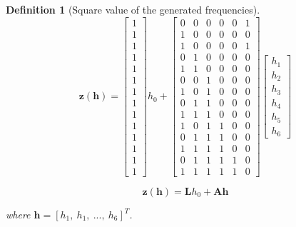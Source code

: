 \documentclass{article}
\newtheorem{mydef}{Definition}[section]
\begin{document}
\begin{mydef}[Square value of the generated frequencies]
\begin{equation}
\mathbf{z}(\mathbf{h})
=  
\begin{bmatrix}
1 \\ 
1 \\ 
1 \\ 
1 \\ 
1 \\ 
1 \\ 
1 \\
1 \\ 
1 \\ 
1 \\ 
1 \\ 
1 \\ 
1 \\ 
1
\end{bmatrix}
h_{0} + 
\begin{bmatrix}
0 & 0 & 0 & 0 & 0 & 1 \\
1 & 0 & 0 & 0 & 0 & 0 \\
1 & 0 & 0 & 0 & 0 & 1 \\
0 & 1 & 0 & 0 & 0 & 0 \\ 
1 & 1 & 0 & 0 & 0 & 0 \\ 
0 & 0 & 1 & 0 & 0 & 0 \\
1 & 0 & 1 & 0 & 0 & 0 \\ 
0 & 1 & 1 & 0 & 0 & 0 \\ 
1 & 1 & 1 & 0 & 0 & 0 \\ 
1 & 0 & 1 & 1 & 0 & 0 \\ 
0 & 1 & 1 & 1 & 0 & 0 \\ 
1 & 1 & 1 & 1 & 0 & 0 \\
0 & 1 & 1 & 1 & 1 & 0 \\
1 & 1 & 1 & 1 & 1 & 0 
\end{bmatrix} 
\begin{bmatrix}
h_{1} \\
h_{2} \\
h_{3} \\
h_{4} \\
h_{5} \\
h_{6}
\end{bmatrix} 
\end{equation}


\begin{equation}
\mathbf{z}(\mathbf{h}) =  \mathbf{L}h_0 +  \mathbf{A} \mathbf{h}
\end{equation}

where $\mathbf{h}=[h_{1},~h_{1},~...,~h_{6}]^T$.

\end{mydef}
\end{document}
